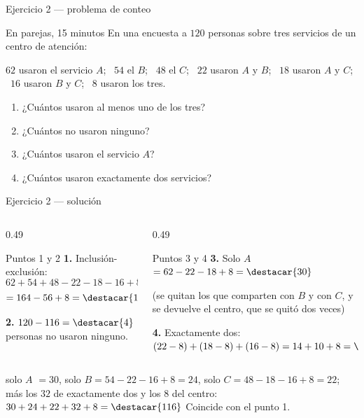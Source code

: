 \documentclass[aspectratio=169,10pt]{beamer}
\begin{document}
\begin{frame}{Ejercicio 2 — problema de conteo}
  \begin{alertblock}{En parejas, 15 minutos}
    \scriptsize
    En una encuesta a $120$ personas sobre tres servicios de un centro de
    atención:

    \vspace{0.06cm}
    {\tiny
    $62$ usaron el servicio $A$; \ $54$ el $B$; \ $48$ el $C$; \
    $22$ usaron $A$ y $B$; \ $18$ usaron $A$ y $C$; \ $16$ usaron $B$ y $C$; \
    $8$ usaron los tres.}

    \vspace{0.08cm}
    \begin{enumerate}\setlength{\itemsep}{-0.02cm}
      \item ¿Cuántos usaron al menos uno de los tres?
      \item ¿Cuántos no usaron ninguno?
      \item ¿Cuántos usaron \azul{solo} el servicio $A$?
      \item ¿Cuántos usaron exactamente dos servicios?
    \end{enumerate}
  \end{alertblock}
\end{frame}

\begin{frame}{Ejercicio 2 — solución}
  \scriptsize
  \begin{columns}[T,onlytextwidth]
    \begin{column}{0.49\textwidth}
      \begin{block}{Puntos 1 y 2}
        \tiny
        \textbf{1.} Inclusión-exclusión:
        \[ 62+54+48-22-18-16+8 \]
        \[ = 164 - 56 + 8 = \destacar{116} \]

        \vspace{0.06cm}
        \textbf{2.} $120 - 116 = \destacar{4}$ personas no usaron ninguno.
      \end{block}
    \end{column}
    \begin{column}{0.49\textwidth}
      \begin{block}{Puntos 3 y 4}
        \tiny
        \textbf{3.} Solo $A$ $= 62 - 22 - 18 + 8 = \destacar{30}$

        \vspace{0.06cm}
        {\color{uniGris}(se quitan los que comparten con $B$ y con $C$, y se
        devuelve el centro, que se quitó dos veces)}

        \vspace{0.08cm}
        \textbf{4.} Exactamente dos:
        $(22-8)+(18-8)+(16-8) = 14+10+8 = \destacar{32}$
      \end{block}
    \end{column}
  \end{columns}

  \vspace{0.08cm}
  {\tiny\color{uniGris}  solo $A$ $=30$, solo $B =
  54-22-16+8 = 24$, solo $C = 48-18-16+8 = 22$; más los $32$ de exactamente
  dos y los $8$ del centro: $30+24+22+32+8 = \destacar{116}$ \checkmark
  Coincide con el punto 1.}
\end{frame}
\end{document}
